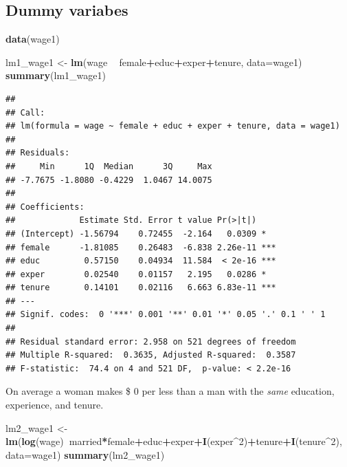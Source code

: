 \documentclass[]{book}
\newenvironment{Shaded}{\begin{snugshade}}{\end{snugshade}}
\newcommand{\DataTypeTok}[1]{\textcolor[rgb]{0.13,0.29,0.53}{#1}}
\newcommand{\DecValTok}[1]{\textcolor[rgb]{0.00,0.00,0.81}{#1}}
\newcommand{\KeywordTok}[1]{\textcolor[rgb]{0.13,0.29,0.53}{\textbf{#1}}}
\newcommand{\NormalTok}[1]{#1}
\newcommand{\OperatorTok}[1]{\textcolor[rgb]{0.81,0.36,0.00}{\textbf{#1}}}
\newcommand{\StringTok}[1]{\textcolor[rgb]{0.31,0.60,0.02}{#1}}
\begin{document}
\hypertarget{dummy-variabes}{%
\subsection{Dummy variabes}\label{dummy-variabes}}

\begin{Shaded}
\begin{Highlighting}[]
\KeywordTok{data}\NormalTok{(wage1)}
\end{Highlighting}
\end{Shaded}

\begin{Shaded}
\begin{Highlighting}[]
\NormalTok{lm1_wage1 <-}\StringTok{ }\KeywordTok{lm}\NormalTok{(wage }\OperatorTok{~}\StringTok{ }\NormalTok{female}\OperatorTok{+}\NormalTok{educ}\OperatorTok{+}\NormalTok{exper}\OperatorTok{+}\NormalTok{tenure, }\DataTypeTok{data=}\NormalTok{wage1)}
\KeywordTok{summary}\NormalTok{(lm1_wage1)}
\end{Highlighting}
\end{Shaded}

\begin{verbatim}
## 
## Call:
## lm(formula = wage ~ female + educ + exper + tenure, data = wage1)
## 
## Residuals:
##     Min      1Q  Median      3Q     Max 
## -7.7675 -1.8080 -0.4229  1.0467 14.0075 
## 
## Coefficients:
##             Estimate Std. Error t value Pr(>|t|)    
## (Intercept) -1.56794    0.72455  -2.164   0.0309 *  
## female      -1.81085    0.26483  -6.838 2.26e-11 ***
## educ         0.57150    0.04934  11.584  < 2e-16 ***
## exper        0.02540    0.01157   2.195   0.0286 *  
## tenure       0.14101    0.02116   6.663 6.83e-11 ***
## ---
## Signif. codes:  0 '***' 0.001 '**' 0.01 '*' 0.05 '.' 0.1 ' ' 1
## 
## Residual standard error: 2.958 on 521 degrees of freedom
## Multiple R-squared:  0.3635, Adjusted R-squared:  0.3587 
## F-statistic:  74.4 on 4 and 521 DF,  p-value: < 2.2e-16
\end{verbatim}

On average a woman makes \$ 0 per less than a man with the \emph{same}
education, experience, and tenure.

\begin{Shaded}
\begin{Highlighting}[]
\NormalTok{lm2_wage1 <-}\StringTok{ }\KeywordTok{lm}\NormalTok{(}\KeywordTok{log}\NormalTok{(wage)}\OperatorTok{~}\NormalTok{married}\OperatorTok{*}\NormalTok{female}\OperatorTok{+}\NormalTok{educ}\OperatorTok{+}\NormalTok{exper}\OperatorTok{+}\KeywordTok{I}\NormalTok{(exper}\OperatorTok{^}\DecValTok{2}\NormalTok{)}\OperatorTok{+}\NormalTok{tenure}\OperatorTok{+}\KeywordTok{I}\NormalTok{(tenure}\OperatorTok{^}\DecValTok{2}\NormalTok{), }\DataTypeTok{data=}\NormalTok{wage1)}
\KeywordTok{summary}\NormalTok{(lm2_wage1)}
\end{Highlighting}
\end{Shaded}
\end{document}
